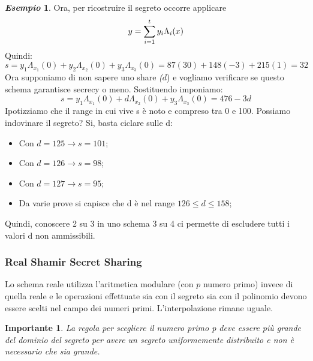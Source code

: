 \documentclass{book}
\newtheorem*{Importante}{\textbf{Importante}}
\theoremstyle{definition}
\newtheorem{esempio}{\emph{Esempio}}
\begin{document}
\begin{esempio}
    Ora, per ricostruire il segreto occorre applicare
    \begin{equation*}
        \centering
        y=\sum_{i=1}^{t}{y_{i}\Lambda_{i}(x)}
    \end{equation*}
    Quindi:
    \begin{equation*}
        s=y_{1}\Lambda_{x_{1}}(0)+y_{2}\Lambda_{x_{2}}(0)+y_{3}\Lambda_{x_{3}}(0)=87(30)+148(-3)+215(1)=32
    \end{equation*}
    Ora supponiamo di non sapere uno share \emph(\(d\)) e vogliamo verificare se questo schema garantisce secrecy o meno\@. Sostituendo imponiamo:
    \begin{equation*}
        s=y_{1}\Lambda_{x_{1}}(0)+d\Lambda_{x_{2}}(0)+y_{3}\Lambda_{x_{3}}(0)= 476-3d
    \end{equation*}
    Ipotizziamo che il range in cui vive s è noto e compreso tra 0 e 100\@. Possiamo indovinare il segreto? Si, basta ciclare sulle d:\begin{itemize}
        \item Con \(d=125\rightarrow s=101\);
        \item Con \(d=126\rightarrow s=98\);
        \item Con \(d=127\rightarrow s=95\);
        \item Da varie prove si capisce che d è nel range \(126\leq d\leq 158\);
    \end{itemize}
    Quindi, conoscere 2 su 3 in uno schema 3 su 4 ci permette di escludere tutti i valori d non ammissibili\@.
\end{esempio}
\subsubsection{Real Shamir Secret Sharing}
Lo schema reale utilizza l'aritmetica modulare (con \(p\) numero primo) invece di quella reale e  le operazioni effettuate sia con il segreto sia con il polinomio devono essere scelti nel campo dei numeri primi\@.\newline
L'interpolazione rimane uguale\@.
\begin{Importante}
    La regola per scegliere il numero primo p deve essere più grande del dominio del segreto per avere un segreto uniformemente distribuito e non è necessario che sia grande\@.
\end{Importante}
\end{document}
